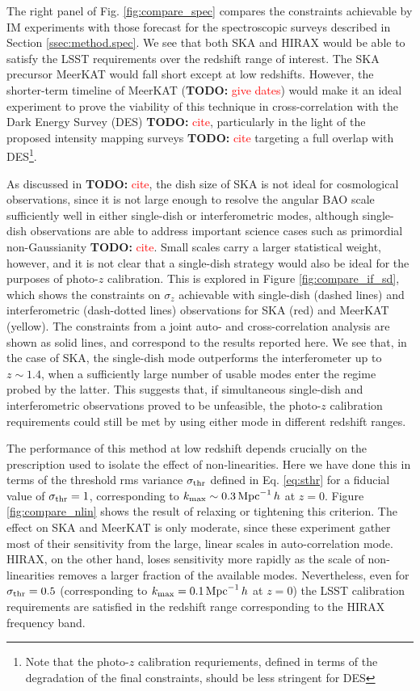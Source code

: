 \documentclass[prd,twocolumn]{revtex4}
\newcommand{\TODO}[1]{{\bf TODO:} \textcolor{red}{#1}}
\begin{document}
    The right panel of Fig. \ref{fig:compare_spec} compares the constraints achievable by IM
    experiments with those forecast for the spectroscopic surveys described in Section
    \ref{ssec:method.spec}. We see that both SKA and HIRAX would be able to satisfy the LSST
    requirements over the redshift range of interest. The SKA precursor MeerKAT would fall short
    except at low redshifts. However, the shorter-term timeline of MeerKAT (\TODO{give dates})
    would make it an ideal experiment to prove the viability of this technique in cross-correlation
    with the Dark Energy Survey (DES) \TODO{cite}, particularly in the light of the proposed
    intensity mapping surveys \TODO{cite} targeting a full overlap with DES\footnote{Note that the photo-$z$
    calibration requriements, defined in terms of the degradation of the final constraints, should
    be less stringent for DES}.
    
    As discussed in \TODO{cite}, the dish size of SKA is not ideal for cosmological observations,
    since it is not large enough to resolve the angular BAO scale sufficiently well in either
    single-dish or interferometric modes, although single-dish observations are able to address
    important science cases such as primordial non-Gaussianity \TODO{cite}. Small scales carry
    a larger statistical weight, however, and it is not clear that a single-dish strategy would
    also be ideal for the purposes of photo-$z$ calibration. This is explored in Figure
    \ref{fig:compare_if_sd}, which shows the constraints on $\sigma_z$ achievable with single-dish
    (dashed lines) and interferometric (dash-dotted lines) observations for SKA (red) and 
    MeerKAT (yellow). The constraints from a joint auto- and cross-correlation analysis are
    shown as solid lines, and correspond to the results reported here. We see that, in the case
    of SKA, the single-dish mode outperforms the interferometer up to $z\sim1.4$, when a
    sufficiently large number of usable modes enter the regime probed by the latter. This suggests
    that, if simultaneous single-dish and interferometric observations proved to be unfeasible,
    the photo-$z$ calibration requirements could still be met by using either mode in different
    redshift ranges.
    
    The performance of this method at low redshift depends crucially on the prescription used to
    isolate the effect of non-linearities. Here we have done this in terms of the threshold
    rms variance $\sigma_{\rm thr}$ defined in Eq. \ref{eq:sthr} for a fiducial value of
    $\sigma_{\rm thr}=1$, corresponding to $k_{\rm max}\sim0.3\,{\rm Mpc}^{-1}\,h$ at $z=0$.
    Figure \ref{fig:compare_nlin} shows the result of relaxing or tightening this criterion.
    The effect on SKA and MeerKAT is only moderate, since these experiment gather most of their
    sensitivity from the large, linear scales in auto-correlation mode. HIRAX, on the other hand,
    loses sensitivity more rapidly as the scale of non-linearities removes a larger fraction 
    of the available modes. Nevertheless, even for $\sigma_{\rm thr}=0.5$ (corresponding to
    $k_{\rm max}=0.1\,{\rm Mpc}^{-1}\,h$ at $z=0$) the LSST calibration requirements are satisfied
    in the redshift range corresponding to the HIRAX frequency band.
\end{document}
